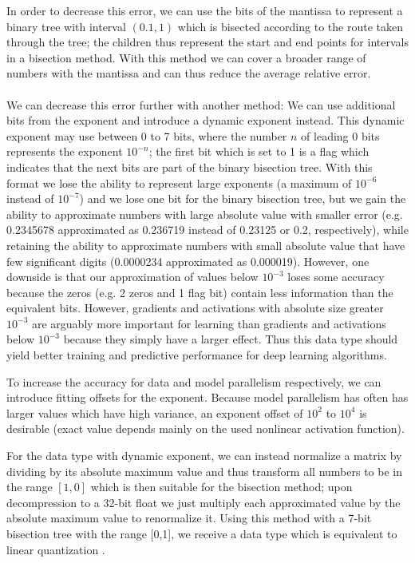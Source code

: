 \documentclass{article} %
\begin{document}
In order to decrease this error, we can use the bits of the mantissa to represent a binary tree with interval $(0.1,1)$ which is bisected according to the route taken through the tree; the children thus represent the start and end points for intervals in a bisection method. With this method we can cover a broader range of numbers with the mantissa and can thus reduce the average relative error. \\\\
We can decrease this error further with another method: We can use additional bits from the exponent and introduce a dynamic exponent instead. This dynamic exponent may use between 0 to 7 bits, where the number $n$ of leading 0 bits represents the exponent $10^{-n}$; the first bit which is set to 1 is a flag which indicates that the next bits are part of the binary bisection tree. With this format we lose the ability to represent large exponents (a maximum of $10^{-6}$ instead of $10^{-7}$) and we lose one bit for the binary bisection tree, but we gain the ability to approximate numbers with large absolute value with smaller error (e.g. 0.2345678 approximated as 0.236719 instead of 0.23125 or 0.2, respectively), while retaining the ability to approximate numbers with small absolute value that have few significant digits (0.0000234 approximated as 0.000019). However, one downside is that our approximation of values below $10^{-3}$ loses some accuracy because the zeros (e.g. 2 zeros and 1 flag bit) contain less information than the equivalent bits. However, gradients and activations with absolute size greater $10^{-3}$ are arguably more important for learning than gradients and activations below $10^{-3}$ because they simply have a larger effect. Thus this data type should yield better training and predictive performance for deep learning algorithms. 

To increase the accuracy for data and model parallelism respectively, we can introduce fitting offsets for the exponent. Because model parallelism has often has larger values which have high variance, an exponent offset of $10^2$ to $10^4$ is desirable (exact value depends mainly on the used nonlinear activation function). 

For the data type with dynamic exponent, we can instead normalize a matrix by dividing by its absolute maximum value and thus transform all numbers to be in the range $[1,0]$ which is then suitable for the bisection method; upon decompression to a 32-bit float we just multiply each approximated value by the absolute maximum value to renormalize it. Using this method with a 7-bit bisection tree with the range [0,1], we receive a data type which is equivalent to linear quantization \citep{vanhoucke2011improving}.
\end{document}
